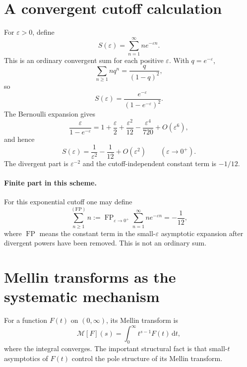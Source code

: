 \documentclass[11pt]{article}
\newcommand{\dd}{\,\mathrm{d}}
\newcommand{\FP}{\operatorname{FP}}
\begin{document}
\section{A convergent cutoff calculation}
For $\varepsilon>0$, define
\begin{equation}
  S(\varepsilon)=\sum_{n=1}^{\infty} n e^{-\varepsilon n}.
\end{equation}
This is an ordinary convergent sum for each positive $\varepsilon$. With $q=e^{-\varepsilon}$,
\begin{equation}
  \sum_{n\ge1} n q^n = \frac{q}{(1-q)^2},
\end{equation}
so
\begin{equation}
  S(\varepsilon)=\frac{e^{-\varepsilon}}{(1-e^{-\varepsilon})^2}.
\end{equation}
The Bernoulli expansion gives
\begin{equation}
  \frac{\varepsilon}{1-e^{-\varepsilon}}
  =1+\frac{\varepsilon}{2}+\frac{\varepsilon^2}{12}-\frac{\varepsilon^4}{720}+O(\varepsilon^6),
\end{equation}
and hence
\begin{equation}
  S(\varepsilon)=\frac{1}{\varepsilon^2}-\frac{1}{12}+O(\varepsilon^2)
  \qquad (\varepsilon\to0^+).
\end{equation}
The divergent part is $\varepsilon^{-2}$ and the cutoff-independent constant term is $-1/12$.

\paragraph{Finite part in this scheme.}
For this exponential cutoff one may define
\begin{equation}
  \sum_{n\ge1}^{(\mathrm{FP})} n
  :=\FP_{\varepsilon\to0^+}\sum_{n=1}^{\infty}n e^{-\varepsilon n}
  =-\frac{1}{12},
\end{equation}
where $\FP$ means the constant term in the small-$\varepsilon$ asymptotic expansion after divergent powers have been removed. This is not an ordinary sum.

\section{Mellin transforms as the systematic mechanism}
For a function $F(t)$ on $(0,\infty)$, its Mellin transform is
\begin{equation}
  \mathcal{M}[F](s)=\int_0^{\infty} t^{s-1}F(t)\dd t,
\end{equation}
where the integral converges. The important structural fact is that small-$t$ asymptotics of $F(t)$ control the pole structure of its Mellin transform.
\end{document}
